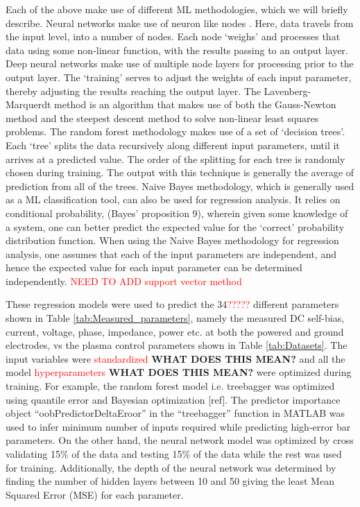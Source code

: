 \documentclass[12pt]{iopart}
\begin{document}
Each of the above make use of different ML methodologies, which we will briefly describe.  Neural networks make use of neuron like nodes \cite{Haykin2009}.  Here, data travels from the input level, into a number of nodes.  Each node `weighs' and processes that data using some non-linear function, with the results passing to an output layer.  Deep neural networks make use of multiple node layers for processing prior to the output layer.  The `training' serves to adjust the weights of each input parameter, thereby adjusting the results reaching the output layer.  The Lavenberg-Marquerdt method is an algorithm that makes use of both the Gauss-Newton method and the steepest descent method to solve non-linear least squares problems.  The random forest methodology makes use of a set of `decision trees'\cite{Ho1995}.  Each `tree' splits the data recursively along different input parameters, until it arrives at a predicted value.  The order of the splitting for each tree is randomly chosen during training.  The output with this technique is generally the average of prediction from all of the trees.  Naive Bayes methodology, which is generally used as a ML classification tool, can also be used for regression analysis\cite{Frank2000}.  It relies on conditional probability, (Bayes' proposition 9), wherein given some knowledge of a system, one can better predict the expected value for the `correct' probability distribution function.  When using the Naive Bayes methodology for regression analysis, one assumes that each of the input parameters are independent, and hence the expected value for each input parameter can be determined independently.  \textcolor{red}{NEED TO ADD support vector method\cite{Vapnik1995}}

These regression models were used to predict the 34\textcolor{red}{?????} different parameters shown in Table \ref{tab:Measured_parameters}, namely the measured DC self-bias, current, voltage, phase, impedance, power etc. at both the powered and ground electrodes, vs the plasma control parameters shown in Table \ref{tab:Datasets}. The input variables were \textcolor{red}{standardized} \textbf{WHAT DOES THIS MEAN?} and all the model \textcolor{red}{hyperparameters} \textbf{WHAT DOES THIS MEAN?} were optimized during training. For example, the random forest model i.e. treebagger was optimized using quantile error and Bayesian optimization [ref]. The predictor importance object ``oobPredictorDeltaEroor'' in the ``treebagger'' function in MATLAB was used to infer minimum number of inputs required while predicting high-error bar parameters. On the other hand, the neural network model was optimized by cross validating 15\% of the data and testing 15\% of the data while the rest was used for training. Additionally, the depth of the neural network was determined by finding the number of hidden layers between 10 and 50 giving the least Mean Squared Error (MSE) for each parameter.
\end{document}
